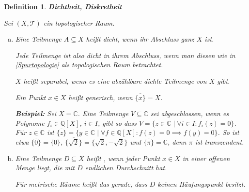 \documentclass[12pt]{scrbook}   %
\newtheorem{definiX}[alles]{Definition}
\newenvironment{defini}[1]{\begin{definiX}{\bf #1}\par\rm}{\end{definiX}}
\begin{document}
\begin{defini}{Dichtheit, Diskretheit} \label{dicht}
Sei $(X,\mathcal T)$ ein topologischer Raum.
\begin{enumerate}[a)]
\item Eine Teilmenge $A\subseteq X$ heißt 
{\it dicht}, wenn ihr Abschluss ganz $X$ ist. 

Jede Teilmenge ist also dicht in ihrem Abschluss, wenn man diesen wie in 
\ref{Spurtopologie} als topologischen Raum betrachtet.

$X$ heißt {\it separabel}, wenn es eine abzählbare dichte Teilmenge von $X$ gibt.

Ein Punkt $x\in X$ heißt {\it generisch}, wenn $\overline{\{x\}}=X$.

{\bf Beispiel:} Sei $X = \mathbb C$. Eine Teilmenge $V\subseteq \mathbb C$ sei abgeschlossen, wenn es Polynome $f_i \in \mathbb Q[X]$, $i\in I$, gibt so dass $V = \{ z \in \mathbb C \mid \forall i \in I: f_i(z) = 0\}$. Für $z\in \mathbb C$ ist $\overline{\{z\}} = \{ y \in \mathbb C \mid \forall f \in \mathbb Q[X]: f(z) = 0 \implies f(y) = 0\}$. So ist etwa $\overline{\{0\}} = \{0\}$, $\overline{\{\sqrt 2\}} = \{ \sqrt 2 , - \sqrt 2\}$ und $\overline{\{\pi\}} = \mathbb C$, denn $\pi$ ist transzendent.

\item Eine Teilmenge $D\subseteq X$ heißt , wenn
jeder Punkt $x\in X$ in einer offenen Menge liegt, die mit $D$ endlichen Durchschnitt 
hat.

Für metrische Räume heißt das gerade, dass $D$ keinen Häufungspunkt 
besitzt. 
\end{enumerate}
\end{defini}
\end{document}
